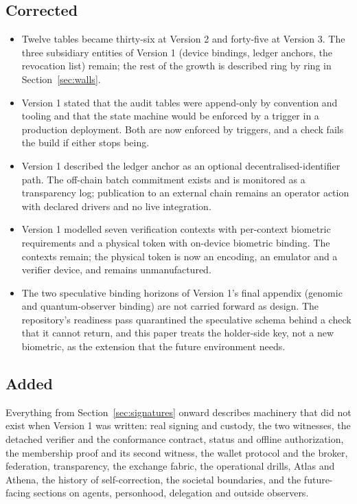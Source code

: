 \subsection*{Corrected}

\begin{itemize}
  \item Twelve tables became thirty-six at Version 2 and forty-five at Version 3. The three
    subsidiary entities of Version 1 (device bindings, ledger anchors, the revocation list) remain;
    the rest of the growth is described ring by ring in Section~\ref{sec:walls}.
  \item Version 1 stated that the audit tables were append-only by convention and tooling and that
    the state machine would be enforced by a trigger in a production deployment. Both are now
    enforced by triggers, and a check fails the build if either stops being.
  \item Version 1 described the ledger anchor as an optional decentralised-identifier path. The
    off-chain batch commitment exists and is monitored as a transparency log; publication to an
    external chain remains an operator action with declared drivers and no live integration.
  \item Version 1 modelled seven verification contexts with per-context biometric requirements and a
    physical token with on-device biometric binding. The contexts remain; the physical token is now
    an encoding, an emulator and a verifier device, and remains unmanufactured.
  \item The two speculative binding horizons of Version 1's final appendix (genomic and
    quantum-observer binding) are not carried forward as design. The repository's readiness pass
    quarantined the speculative schema behind a check that it cannot return, and this paper treats
    the holder-side key, not a new biometric, as the extension that the future environment needs.
\end{itemize}

\subsection*{Added}

Everything from Section~\ref{sec:signatures} onward describes machinery that did not exist when
Version 1 was written: real signing and custody, the two witnesses, the detached verifier and the
conformance contract, status and offline authorization, the membership proof and its second witness,
the wallet protocol and the broker, federation, transparency, the exchange fabric, the operational
drills, Atlas and Athena, the history of self-correction, the societal boundaries, and the
future-facing sections on agents, personhood, delegation and outside observers.
